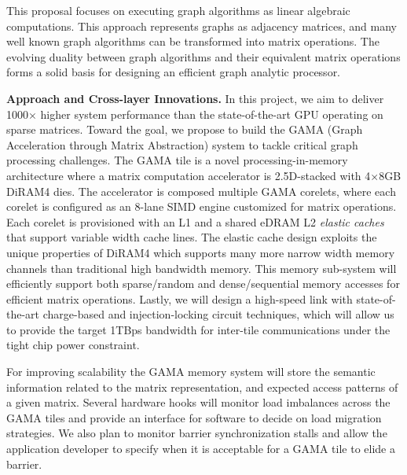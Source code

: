 \noindent
This proposal focuses on executing graph algorithms as linear algebraic computations. 
This approach represents graphs as adjacency matrices, and many well known graph algorithms can be transformed into matrix operations. 
The evolving 
duality between graph algorithms and their equivalent matrix operations forms a solid basis 
for designing an efficient graph analytic processor. 

\vspace{3pt}
\noindent
\textbf{Approach and Cross-layer Innovations.} 
In this project, we aim to deliver 1000$\times$ higher system performance than the state-of-the-art GPU operating on sparse matrices.
Toward the goal, we propose to build the GAMA (Graph Acceleration through Matrix Abstraction) system to tackle critical graph processing challenges. 
The GAMA tile is a novel processing-in-memory architecture where a matrix computation accelerator is 2.5D-stacked with 4$\times$8GB DiRAM4 dies.
The accelerator is composed multiple GAMA corelets, where each corelet is configured as an 8-lane SIMD engine customized for matrix operations. Each corelet 
is provisioned with an L1 and a shared eDRAM L2 \emph{elastic caches} that support variable width cache lines.  
The elastic cache design exploits the unique properties of DiRAM4 which supports many more narrow width memory channels than traditional high bandwidth memory.
This memory sub-system will efficiently support both sparse/random and dense/sequential memory accesses for efficient matrix operations. 
Lastly, we will design a high-speed link with state-of-the-art charge-based and injection-locking circuit techniques, which will allow us to provide the target 1TBps bandwidth for inter-tile communications under the tight chip power constraint.

For improving scalability the GAMA memory system will store the semantic information related to the matrix representation, and expected access patterns of a given matrix. Several hardware hooks will monitor  load imbalances across the GAMA tiles and provide an interface for software to decide on load migration strategies. We also plan to monitor barrier synchronization stalls and allow the application developer to specify when it is acceptable for a GAMA tile to elide a barrier. 

